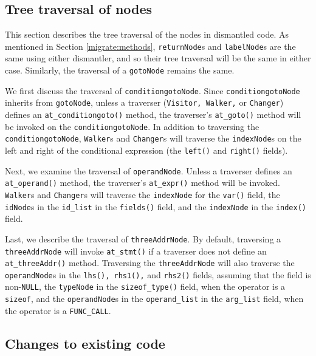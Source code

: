 \documentclass{article}
\begin{document}
\subsection{\label{migrate:tree} Tree traversal of nodes}

This section describes the tree traversal of the nodes in dismantled code.
As mentioned in Section \ref{migrate:methods}, \texttt{returnNode}s and
\texttt{labelNode}s are the same using either dismantler, and so their
tree traversal will be the same in either case.  Similarly, the traversal
of a \texttt{gotoNode} remains the same.

We first discuss the traversal of \texttt{conditiongotoNode}.  Since
\texttt{conditiongotoNode} inherits from \texttt{gotoNode}, unless a
traverser (\texttt{Visitor, Walker,} or \texttt{Changer}) defines an 
\texttt{at\_conditiongoto()} method, the traverser's 
\texttt{at\_goto()} method will be invoked on the 
\texttt{conditiongotoNode}.  In addition to traversing the 
\texttt{conditiongoto\-Node}, \texttt{Walker}s and \texttt{Changer}s will
traverse the \texttt{indexNode}s on the left and right of the conditional
expression (the \texttt{left()} and \texttt{right()} fields).

Next, we examine the traversal of \texttt{operandNode}.  Unless a traverser
defines an \texttt{at\_operand()} method, the traverser's
\texttt{at\_expr()} method will be invoked.  \texttt{Walker}s and
\texttt{Changer}s will traverse the \texttt{indexNode} for the \texttt{var()}
field, the \texttt{idNode}s in the \texttt{id\_list} in the
\texttt{fields()} field, and the \texttt{indexNode} in the 
\texttt{index()} field.

Last, we describe the traversal of \texttt{threeAddrNode}.  By default,
traversing a \texttt{threeAddrNode} will invoke \texttt{at\_stmt()}
if a traverser does not define an \texttt{at\_threeAddr()} method.
Traversing the \texttt{threeAddrNode} will also traverse the 
\texttt{operandNode}s in the \texttt{lhs(), rhs1(),} and \texttt{rhs2()} 
fields, assuming that the field is non-\texttt{NULL}, the
\texttt{typeNode} in the \texttt{sizeof\_type()} field, when the operator
is a \texttt{sizeof}, and the \texttt{operandNode}s in the
\texttt{operand\_list} in the \texttt{arg\_list} field, when the
operator is a \texttt{FUNC\_CALL}.

\subsection{\label{migrate:change} Changes to existing code}
\end{document}
